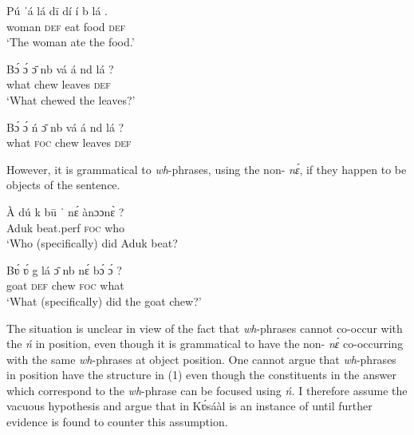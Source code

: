 \documentclass[output=paper
,newtxmath
,modfonts
,nonflat]{langsci/langscibook}
\begin{document}
{      \ea
      \gll P\'{u} ˈ\'{a}   l\'{a}   d\={i}   d\'{i} \'{i} b  l\'{a} .\\
      woman  \textsc{def}   eat  food   \textsc{def}        \\
      \glt ‘The woman ate the food.’                              
      \z
      
      \ea
      \gll B\'{ɔ} \'{ɔ}   \={ɔ} nb  v\'{a} \'{a} nd  l\'{a} ?     \\
      what  chew   leaves   \textsc{def}         \\
      \glt ‘What chewed the leaves?’        
      \z
      
      \ea\label{ex:abubakari:fnvi}
      \gll *B\'{ɔ} \'{ɔ}   \'{n}   \={ɔ} nb  v\'{a} \'{a} nd  l\'{a} ?     \\
      what   \textsc{foc}  chew   leaves   \textsc{def}\\
      \z 
     
    However, it is grammatical to  \textit{wh}-phrases, using the non-  \textit{nɛ́}, if they happen to be objects of the sentence.                                        
    
    \ea 
    \gll \`{A} d\'{u} k  b\={u} ˈ    nɛ́  ànɔɔn\`{ɛ} ? \\ 
    Aduk  beat.perf   \textsc{foc}  who       \\
    \glt ‘Who (specifically) did Aduk beat?       
    \z
    
    \ea
    \gll B\'{ʋ} \'{ʋ} g  l\'{a}   \={ɔ} nb  n\'{ɛ}   b\'{ɔ} \'{ɔ} ?    \\
    goat  \textsc{def}  chew  \textsc{foc}  what    \\
    \glt ‘What (specifically) did the goat chew?’      
    \z 
     
    The situation is unclear in view of the fact that \textit{wh}{}-phrases cannot co-occur with the  \textit{ń} in  position, even though it is grammatical to have the non-  \textit{nɛ́} co-occurring with the same \textit{wh}{}-phrases at object position. One cannot argue that \textit{wh}{}-phrases in  position have the structure in (1) even though the constituents in the answer which correspond to the \textit{wh}{}-phrase can be focused using \textit{ń.} I therefore assume the vacuous  hypothesis and argue that   in Kʋ́sáàl is an instance of  until further evidence is found to counter this assumption.
 
 }  
\end{document}
